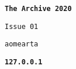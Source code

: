 \documentclass[../main.tex]{subfiles}
\begin{document}
	\begin{titlepage}
		\begin{center}
			\vspace*{1cm}
			
			\textbf{\huge\texttt{The Archive 2020}}

			\vspace{0.5cm}

			\large\texttt{Issue 01}
			
			\vspace{0.5cm}
			
			
			\vspace{1.5cm}
			
			\texttt{aomearta}
			
			\vfill
			
			\vspace{0.8cm}
			\textbf{\large\texttt{127.0.0.1}}
			
		\end{center}
	\end{titlepage}
\end{document}
